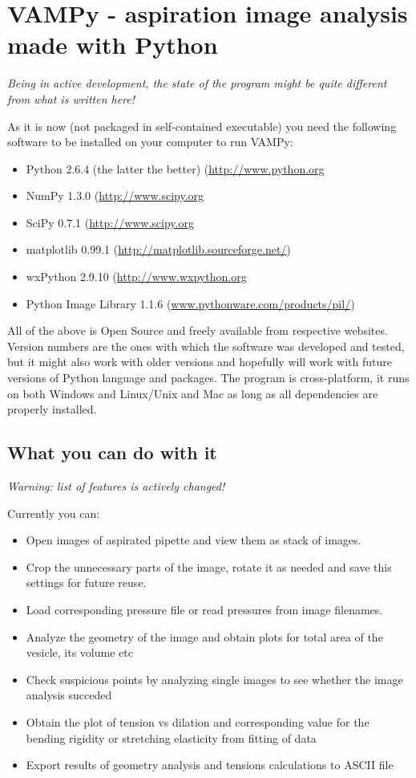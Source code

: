 \documentclass[a4paper,12pt]{article}
\begin{document}
\section{VAMPy - aspiration image analysis made with Python}\label{vampy}
\emph{Being in active development, the state of the program might be quite different from what is written here!}

As it is now (not packaged in self-contained executable) you need the following software to be installed on your computer to run VAMPy:
\begin{itemize}
	\item Python 2.6.4 (the latter the better) (\url{http://www.python.org}
	\item NumPy 1.3.0 (\url{http://www.scipy.org}
	\item SciPy 0.7.1 (\url{http://www.scipy.org}
	\item matplotlib 0.99.1 (\url{http://matplotlib.sourceforge.net/})
	\item wxPython 2.9.10 (\url{http://www.wxpython.org}
	\item Python Image Library 1.1.6 (\url{www.pythonware.com/products/pil/}) 
\end{itemize}
All of the above is Open Source and freely available from respective websites. Version numbers are the ones with which the software was developed and tested, but it might also work with older versions and hopefully will work with future versions of Python language and packages. The program is cross-platform, it runs on both Windows and Linux/Unix and Mac as long as all dependencies are properly installed.

\subsection{What you can do with it}\label{vampy-features}
\emph{Warning: list of features is actively changed!}

Currently you can:
\begin{itemize}
	\item Open images of aspirated pipette and view them as stack of images.
	\item Crop the unnecessary parts of the image, rotate it as needed and save this settings for future reuse.
	\item Load corresponding pressure file or read pressures from image filenames.
	\item Analyze the geometry of the image and obtain plots for total area of the vesicle, its volume etc
	\item Check suspicious points by analyzing single images to see whether the image analysis succeded
	\item Obtain the plot of tension vs dilation and corresponding value for the bending rigidity or stretching elasticity from fitting of data
	\item Export results of geometry analysis and tensions calculations to ASCII file
\end{itemize}
\end{document}
